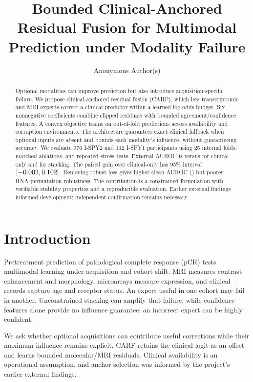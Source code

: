 \documentclass[runningheads]{llncs}
\title{Bounded Clinical-Anchored Residual Fusion for Multimodal Prediction under Modality Failure}
\author{Anonymous Author(s)}
\institute{Institution withheld for double-blind review}
\begin{document}
\maketitle
\begin{abstract}
Optional modalities can improve prediction but also introduce acquisition-specific failure. We propose clinical-anchored residual fusion (CARF), which lets transcriptomic and MRI experts correct a clinical predictor within a learned log-odds budget. Six nonnegative coefficients combine clipped residuals with bounded agreement/confidence features. A convex objective trains on out-of-fold predictions across availability and corruption environments. The architecture guarantees exact clinical fallback when optional inputs are absent and bounds each modality's influence, without guaranteeing accuracy. We evaluate 976 I-SPY2 and 112 I-SPY1 participants using 25 internal folds, matched ablations, and repeated stress tests. External AUROC is \CarfAuc{} versus \AnchorAuc{} for clinical-only and \StackAuc{} for stacking. The paired gain over clinical-only has 95\% interval $[-0.002,0.102]$. Removing robust loss gives higher clean AUROC (\NoRobustAuc{}) but poorer RNA-permutation robustness. The contribution is a constrained formulation with verifiable stability properties and a reproducible evaluation. Earlier external findings informed development; independent confirmation remains necessary.
\end{abstract}

\section{Introduction}
Pretreatment prediction of pathological complete response (pCR) tests multimodal learning under acquisition and cohort shift. MRI measures contrast enhancement and morphology, microarrays measure expression, and clinical records capture age and receptor status. An expert useful in one cohort may fail in another. Unconstrained stacking can amplify that failure, while confidence features alone provide no influence guarantee: an incorrect expert can be highly confident.

We ask whether optional acquisitions can contribute useful corrections while their maximum influence remains explicit. CARF retains the clinical logit as an offset and learns bounded molecular/MRI residuals. Clinical availability is an operational assumption, and anchor selection was informed by the project's earlier external findings.
\end{document}

